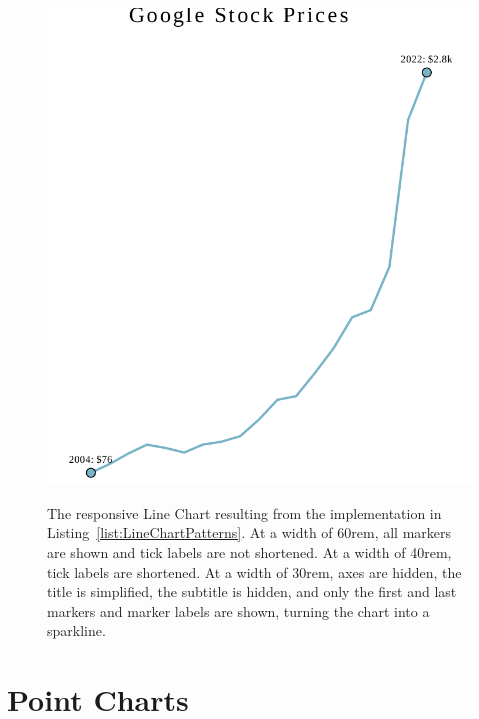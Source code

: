 \begin{figure}[tp]
{  \includegraphics[valign=b,scale=\respscale]{diagrams/respvis-line-30rem.pdf}%
  \label{fig:LineChartPatterns30rem}%
}
\caption[Responsive RespVis Line Chart]{%
The responsive Line Chart resulting from the implementation in
Listing~\ref{list:LineChartPatterns}.
 At a width of 60rem, all markers
are shown and tick labels are not shortened.
 At a width of 40rem, tick labels
are shortened.  At a width of
30rem, axes are hidden, the title is simplified, the subtitle is
hidden, and only the first and last markers and marker labels are
shown, turning the chart into a sparkline.
}
\label{fig:LineChartPatterns}
\end{figure}









\section{Point Charts}
\label{sec:PointChartsUsage}


